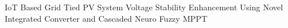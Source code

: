 IoT Based Grid Tied PV System Voltage Stability Enhancement Using Novel Integrated Converter and Cascaded Neuro Fuzzy MPPT